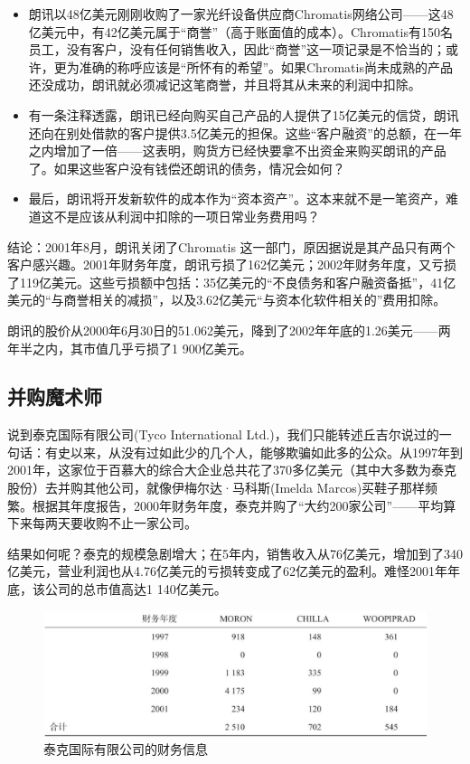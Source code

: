 \documentclass[12pt,oneside]{book}
\begin{document}
\begin{itemize}
\item 朗讯以48亿美元刚刚收购了一家光纤设备供应商Chromatis网络公司——这48亿美元中，有42亿美元属于“商誉”（高于账面值的成本）。Chromatis有150名员工，没有客户，没有任何销售收入，因此“商誉”这一项记录是不恰当的；或许，更为准确的称呼应该是“所怀有的希望”。如果Chromatis尚未成熟的产品还没成功，朗讯就必须减记这笔商誉，并且将其从未来的利润中扣除。

\item 有一条注释透露，朗讯已经向购买自己产品的人提供了15亿美元的信贷，朗讯还向在别处借款的客户提供3.5亿美元的担保。这些“客户融资”的总额，在一年之内增加了一倍——这表明，购货方已经快要拿不出资金来购买朗讯的产品了。如果这些客户没有钱偿还朗讯的债务，情况会如何？

\item 最后，朗讯将开发新软件的成本作为“资本资产”。这本来就不是一笔资产，难道这不是应该从利润中扣除的一项日常业务费用吗？
\end{itemize}

结论：2001年8月，朗讯关闭了Chromatis 这一部门，原因据说是其产品只有两个客户感兴趣。2001年财务年度，朗讯亏损了162亿美元；2002年财务年度，又亏损了119亿美元。这些亏损额中包括：35亿美元的“不良债务和客户融资备抵”，41亿美元的“与商誉相关的减损”，以及3.62亿美元“与资本化软件相关的”费用扣除。

朗讯的股价从2000年6月30日的51.062美元，降到了2002年年底的1.26美元——两年半之内，其市值几乎亏损了1 900亿美元。

\subsection{并购魔术师}
说到泰克国际有限公司(Tyco International Ltd.)，我们只能转述丘吉尔说过的一句话：有史以来，从没有过如此少的几个人，能够欺骗如此多的公众。从1997年到2001年，这家位于百慕大的综合大企业总共花了370多亿美元（其中大多数为泰克股份）去并购其他公司，就像伊梅尔达·马科斯(Imelda Marcos)买鞋子那样频繁。根据其年度报告，2000年财务年度，泰克并购了“大约200家公司”——平均算下来每两天要收购不止一家公司。

结果如何呢？泰克的规模急剧增大；在5年内，销售收入从76亿美元，增加到了340亿美元，营业利润也从4.76亿美元的亏损转变成了62亿美元的盈利。难怪2001年年底，该公司的总市值高达1 140亿美元。

\begin{figure}[H]
\centering
\includegraphics[width=\linewidth ,totalheight=0.95\textheight , keepaspectratio]{泰克国际有限公司的财务信息.jpg}
\caption{泰克国际有限公司的财务信息}
\end{figure}
\end{document}
